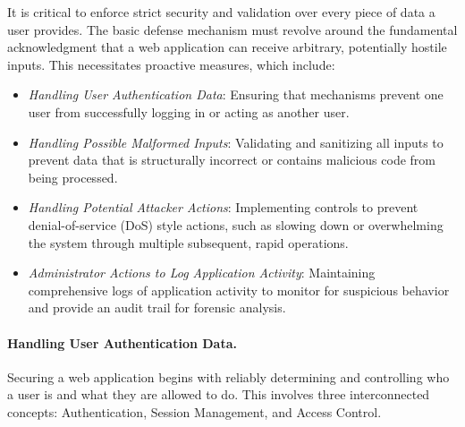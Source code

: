 It is critical to enforce strict security and validation over every piece of data a user provides. The basic defense mechanism must revolve around the fundamental acknowledgment that a web application can receive arbitrary, potentially hostile inputs. This necessitates proactive measures, which include:

\begin{itemize}
    \item \textit{Handling User Authentication Data}: Ensuring that mechanisms prevent one user from successfully logging in or acting as another user.
    \item \textit{Handling Possible Malformed Inputs}: Validating and sanitizing all inputs to prevent data that is structurally incorrect or contains malicious code from being processed.
    \item \textit{Handling Potential Attacker Actions}: Implementing controls to prevent denial-of-service (DoS) style actions, such as slowing down or overwhelming the system through multiple subsequent, rapid operations.
    \item \textit{Administrator Actions to Log Application Activity}: Maintaining comprehensive logs of application activity to monitor for suspicious behavior and provide an audit trail for forensic analysis.
\end{itemize}

\paragraph{Handling User Authentication Data.} Securing a web application begins with reliably determining and controlling who a user is and what they are allowed to do. This involves three interconnected concepts: Authentication, Session Management, and Access Control.

